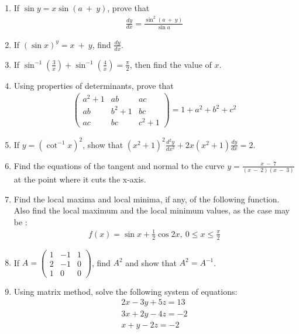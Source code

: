 \documentclass[10pt,-letter paper]{article}
\providecommand{\brak}[1]{\ensuremath{\left(#1\right)}}
\newcommand{\myvec}[1]{\ensuremath{\begin{pmatrix}#1\end{pmatrix}}}
\begin{document}
\begin{enumerate}
\item If $\sin{y} = x\sin{\brak{a~+~y}}$, prove that 
	\begin{align*}
		\frac{dy}{dx} = \frac{\sin^{2}\brak{a~+~y}}{\sin{a}}
	\end{align*}
\item If $\brak{\sin x}^y = {x~+~y}$, find $\frac{dy}{dx}$.
\item If $\sin^{-1}\brak{\frac{3}{x}} + \sin^{-1}\brak{\frac{4}{x}} = \frac{\pi}{2}$, then find the value of $x$.
\item Using properties of determinants, prove that
	\begin{align*}
		\myvec{{a}^2 + {1} & {a}{b} & {a}{c} \\ {a}{b} & {b}^2+{1} & {b}{c} \\ {a}{c} & {b}{c} & {c}^2+{1}} = 1+{a}^2+{b}^2+{c}^2
	\end{align*}

\item If $y = \brak{{\cot^{-1}{x}}}^2$, show that $\brak{{x}^2+{1}}^2\frac{d^2y}{dx^2} + 2{x} \brak{{x^2}+{1}} \frac{dy}{dx} = 2$.

\item Find the equations of the tangent and normal to the curve $y = \frac{x~-~7}{\brak{x~-~2}\brak{x~-~3}}$ at the point where it cuts the x-axis.
\item Find the local maxima and local minima, if any, of the following function. Also find the local maximum and the local minimum values, as the case may be : 
	\begin{align*}
		f\brak{x} = \sin {x} + \frac{1}{2} \cos{2x},~0\leq{x}\leq \frac{\pi}{2}
	\end{align*}
\item If $A=\myvec{1&-1&1 \\ 2&-1&0 \\ 1&0&0}$, find $A^2$ and show that $A^2 = A^{-1}$.
\item Using matrix method, solve the following system of equations:
	\begin{align*}
		2{x}-3{y}+5{z}=13 \\
		3{x}+2{y}-4{z}=-2 \\
		{x}+{y}-2{z}=-2
	\end{align*}
\end{enumerate}
\end{document}
